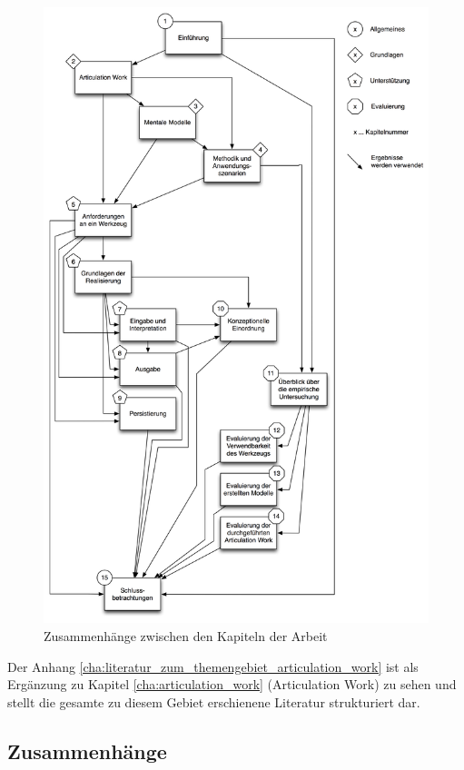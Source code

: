 \begin{figure}[htbp]
	\centering
		\includegraphics[scale=0.5]{img/Einfuehrung/gesamtueberblick.png}
	\caption{Zusammenhänge zwischen den Kapiteln der Arbeit}
	\label{fig:img_Einfuehrung_gesamtueberblick}
\end{figure}

Der Anhang \ref{cha:literatur_zum_themengebiet_articulation_work} ist als Ergänzung zu Kapitel \ref{cha:articulation_work} (Articulation Work) zu sehen und stellt die gesamte zu diesem Gebiet erschienene Literatur strukturiert dar.

\subsection{Zusammenhänge} %
\label{sub:zusammenhänge}

